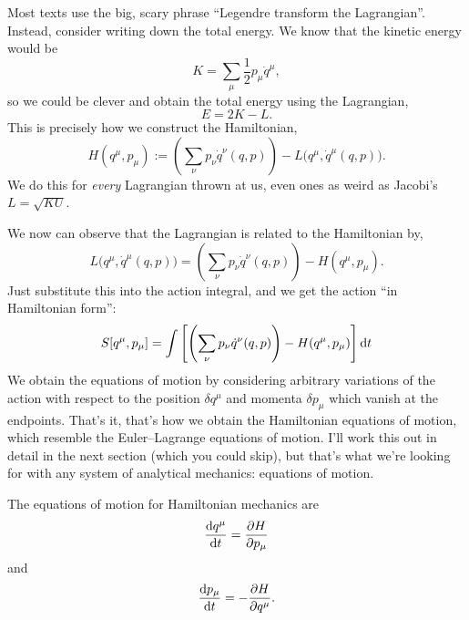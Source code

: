 Most texts use the big, scary phrase ``Legendre transform the Lagrangian''.
Instead, consider writing down the total energy. We know that the
kinetic energy would be
\begin{equation}
K = \sum_{\mu}\frac{1}{2}p_{\mu}\dot{q}^{\mu},
\end{equation}
so we could be clever and obtain the total energy using the Lagrangian,
\begin{equation}
E = 2K - L.
\end{equation}
This is precisely how we construct the Hamiltonian,
\begin{equation}
\boxed{H(q^{\mu}, p_{\mu}) := \left(\sum_{\nu}p_{\nu}\dot{q}^{\nu}(q,p)\right) - L\bigl(q^{\mu}, \dot{q}^{\mu}(q,p)\bigr).}
\end{equation}
We do this for \emph{every} Lagrangian thrown at us, even ones as weird
as Jacobi's $L=\sqrt{KU}$.

We now can observe that the Lagrangian is related to the Hamiltonian by,
\begin{equation}
L\bigl(q^{\mu}, \dot{q}^{\mu}(q,p)\bigr) = \left(\sum_{\nu}p_{\nu}\dot{q}^{\nu}(q,p)\right) - 
H(q^{\mu}, p_{\mu}).
\end{equation}
Just substitute this into the action integral, and we get the action
``in Hamiltonian form'':
\begin{equation}\label{eq:hamiltonian:action-integral}
S[q^{\mu}, p_{\mu}] = \int \left[\left(\sum_{\nu}p_{\nu}\dot{q}^{\nu}(q,p)\right) - 
H(q^{\mu}, p_{\mu})\right]\mathrm{d} t
\end{equation}
We obtain the equations of motion by considering arbitrary variations of
the action with respect to the position $\delta q^{\mu}$ and momenta
$\delta p_{\mu}$ which vanish at the endpoints. That's it, that's how we
obtain the Hamiltonian equations of motion, which resemble the
Euler--Lagrange equations of motion. I'll work this out in detail in the
next section (which you could skip), but that's what we're looking for
with any system of analytical mechanics: equations of motion.

The equations of motion for Hamiltonian mechanics are
\begin{equation}
\frac{\mathrm{d} q^{\mu}}{\mathrm{d} t} = \frac{\partial H}{\partial p_{\mu}}
\end{equation}
and
\begin{equation}
\frac{\mathrm{d} p_{\mu}}{\mathrm{d} t} = -\frac{\partial H}{\partial q^{\mu}}.
\end{equation}

